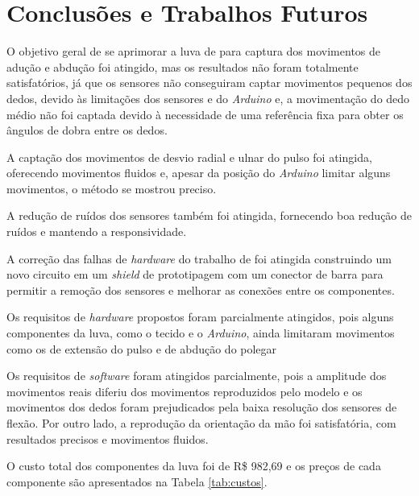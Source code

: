 \chapter{Conclusões e Trabalhos Futuros}
\label{ch:conclusao}

\vspace{-1.9cm}
O objetivo geral de se aprimorar a luva de  para captura dos movimentos de adução e abdução foi atingido, mas os resultados não foram totalmente satisfatórios, já que os sensores não conseguiram captar movimentos pequenos dos dedos, devido às limitações dos sensores e do \textit{Arduino} e, a movimentação do dedo médio não foi captada devido à necessidade de uma referência fixa para obter os ângulos de dobra entre os dedos.

A captação dos movimentos de desvio radial e ulnar do pulso foi atingida, oferecendo movimentos fluidos e, apesar da posição do \textit{Arduino} limitar alguns movimentos, o método se mostrou preciso.

A redução de ruídos dos sensores também foi atingida, fornecendo boa redução de ruídos e mantendo a responsividade.

A correção das falhas de \textit{hardware} do trabalho de  foi atingida construindo um novo circuito em um \textit{shield} de prototipagem com um conector de barra para permitir a remoção dos sensores e melhorar as conexões entre os componentes.

Os requisitos de \textit{hardware} propostos  foram parcialmente atingidos, pois alguns componentes da luva, como o tecido e o \textit{Arduino}, ainda limitaram movimentos como os de extensão do pulso e de abdução do polegar

Os requisitos de \textit{software} foram atingidos parcialmente, pois a amplitude dos movimentos reais diferiu dos movimentos reproduzidos pelo modelo e os movimentos dos dedos foram prejudicados pela baixa resolução dos sensores de flexão. Por outro lado, a reprodução da orientação da mão foi satisfatória, com resultados precisos e movimentos fluidos.

O custo total dos componentes da luva foi de R\$ 982,69 e os preços de cada componente são apresentados na Tabela \ref{tab:custos}.

